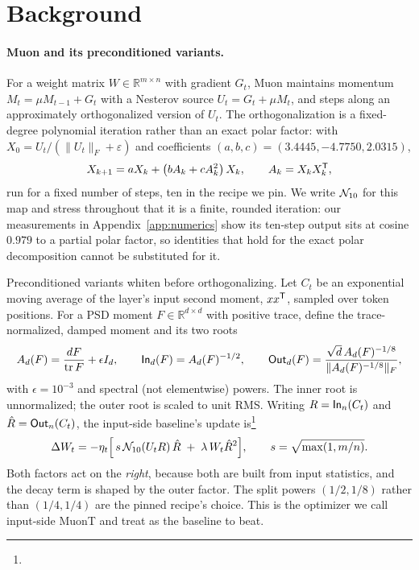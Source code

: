 \section{Background}
\label{sec:background}

\paragraph{Muon and its preconditioned variants.}
For a weight matrix $W\in\mathbb R^{m\times n}$ with gradient $G_t$, Muon
\citep{jordan2024muon} maintains momentum $M_t=\mu M_{t-1}+G_t$ with a Nesterov
source $U_t=G_t+\mu M_t$, and steps along an approximately orthogonalized
version of $U_t$. The orthogonalization is a fixed-degree polynomial iteration
rather than an exact polar factor: with $X_0=U_t/(\|U_t\|_F+\varepsilon)$ and
coefficients $(a,b,c)=(3.4445,-4.7750,2.0315)$,
\begin{equation}
\label{eq:ns}
X_{k+1}=aX_k+\left(bA_k+cA_k^2\right)X_k,\qquad A_k=X_kX_k^{{\mathsf T}},
\end{equation}
run for a fixed number of steps, ten in the recipe we pin. We write $\mathcal{N}_{10}$ for
this map and stress throughout that it is a finite, rounded iteration: our
measurements in Appendix~\ref{app:numerics} show its ten-step output sits at
cosine $0.979$ to a partial polar factor, so identities that hold for the exact
polar decomposition cannot be substituted for it.

Preconditioned variants whiten before orthogonalizing. Let
$C_t$ be an exponential moving average of the layer's input second moment,
$x x^{{\mathsf T}}$, sampled over token positions. For a PSD moment
$F\in\mathbb R^{d\times d}$ with positive trace, define the trace-normalized,
damped moment and its two roots
\begin{equation}
\label{eq:factors}
A_d(F)=\frac{dF}{\operatorname{tr} F}+\epsilon I_d,\qquad
\mathsf{In}_d(F)=A_d(F)^{-1/2},\qquad
\mathsf{Out}_d(F)=\frac{\sqrt d\,A_d(F)^{-1/8}}{\|A_d(F)^{-1/8}\|_F},
\end{equation}
with $\epsilon=10^{-3}$ and spectral (not elementwise) powers. The inner root
is unnormalized; the outer root is scaled to unit RMS. Writing
$R=\mathsf{In}_n(C_t)$ and $\hat R=\mathsf{Out}_n(C_t)$, the input-side baseline's update
is\footnote{}
\begin{equation}
\label{eq:muont}
\Delta W_t=-\eta_t\Bigl[\,s\,\mathcal{N}_{10}\!\left(U_tR\right)\hat R
\;+\;\lambda\,W_t\hat R^{2}\Bigr],
\qquad s=\sqrt{\max(1,m/n)} .
\end{equation}
Both factors act on the \emph{right}, because both are built from input
statistics, and the decay term is shaped by the outer factor. The split powers
$(1/2,1/8)$ rather than $(1/4,1/4)$ are the pinned recipe's choice. This is the
optimizer we call input-side MuonT and treat as the baseline to beat.

